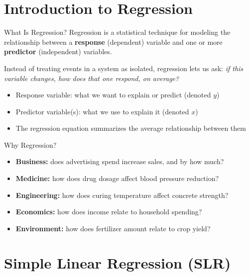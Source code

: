 \section{Introduction to Regression}

\begin{frame}{What Is Regression?}
	Regression is a statistical technique for modeling the relationship between a \textbf{response} (dependent) variable and one or more \textbf{predictor} (independent) variables.
	\svspace{0.5em}

	Instead of treating events in a system as isolated, regression lets us ask: \emph{if this variable changes, how does that one respond, on average?}
	\svspace{0.5em}

	\begin{itemize}
		\item Response variable: what we want to explain or predict (denoted $y$)
		\item Predictor variable(s): what we use to explain it (denoted $x$)
		\item The regression equation summarizes the average relationship between them
	\end{itemize}
\end{frame}


\begin{frame}{Why Regression?}
	\begin{itemize}
		\item \textbf{Business:} does advertising spend increase sales, and by how much?
		\item \textbf{Medicine:} how does drug dosage affect blood pressure reduction?
		\item \textbf{Engineering:} how does curing temperature affect concrete strength?
		\item \textbf{Economics:} how does income relate to household spending?
		\item \textbf{Environment:} how does fertilizer amount relate to crop yield?
	\end{itemize}
\end{frame}


\section{Simple Linear Regression (SLR)}


